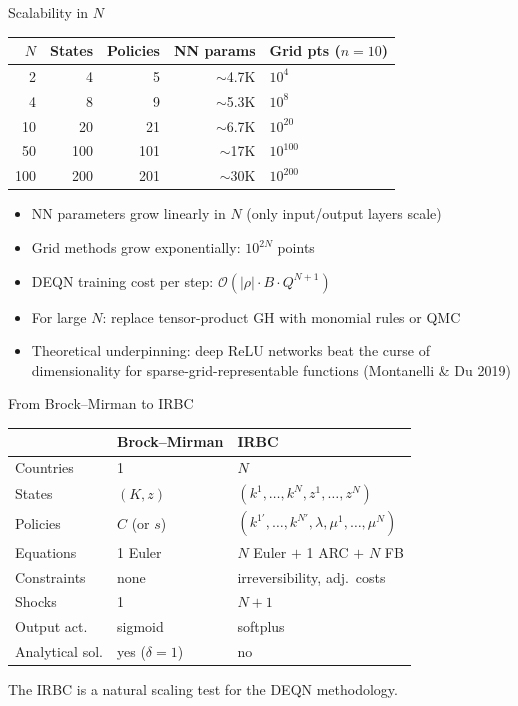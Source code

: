 \documentclass[aspectratio=169,11pt]{beamer}
\newcommand{\emphc}[1]{\textcolor{harvardcrimson}{#1}}
\begin{document}
\begin{frame}{Scalability in $N$}
\begin{center}
\begin{tabular}{rrrrl}
\toprule
$N$ & \textbf{States} & \textbf{Policies} & \textbf{NN params} & \textbf{Grid pts ($n\!=\!10$)} \\
\midrule
2 & 4 & 5 & $\sim$4.7K & $10^4$ \\
4 & 8 & 9 & $\sim$5.3K & $10^8$ \\
10 & 20 & 21 & $\sim$6.7K & $10^{20}$ \\
50 & 100 & 101 & $\sim$17K & $10^{100}$ \\
100 & 200 & 201 & $\sim$30K & $10^{200}$ \\
\bottomrule
\end{tabular}
\end{center}

\vspace{0.5em}
\begin{itemize}
    \item NN parameters grow \emphc{linearly} in $N$ (only input/output layers scale)
    \item Grid methods grow \emphc{exponentially}: $10^{2N}$ points
    \item DEQN training cost per step: $\mathcal{O}(|\rho| \cdot B \cdot Q^{N+1})$
    \item For large $N$: replace tensor-product GH with monomial rules or QMC
    \item Theoretical underpinning: \emphc{deep ReLU networks} beat the curse of dimensionality for sparse-grid-representable functions (Montanelli \& Du 2019)
\end{itemize}
\end{frame}

\begin{frame}{From Brock--Mirman to IRBC}
\begin{center}
\begin{tabular}{lll}
\toprule
& \textbf{Brock--Mirman} & \textbf{IRBC} \\
\midrule
Countries & 1 & $N$ \\
States & $(K, z)$ & $(k^1, \ldots, k^N, z^1, \ldots, z^N)$ \\
Policies & $C$ (or $s$) & $(k^{1\prime}, \ldots, k^{N\prime}, \lambda, \mu^1, \ldots, \mu^N)$ \\
Equations & 1 Euler & $N$ Euler $+$ 1 ARC $+$ $N$ FB \\
Constraints & none & irreversibility, adj.\ costs \\
Shocks & 1 & $N+1$ \\
Output act. & sigmoid & softplus \\
Analytical sol. & yes ($\delta=1$) & no \\
\bottomrule
\end{tabular}
\end{center}

\vspace{0.3em}
{\small The IRBC is a natural \emphc{scaling test} for the DEQN methodology.}
\end{frame}
\end{document}
